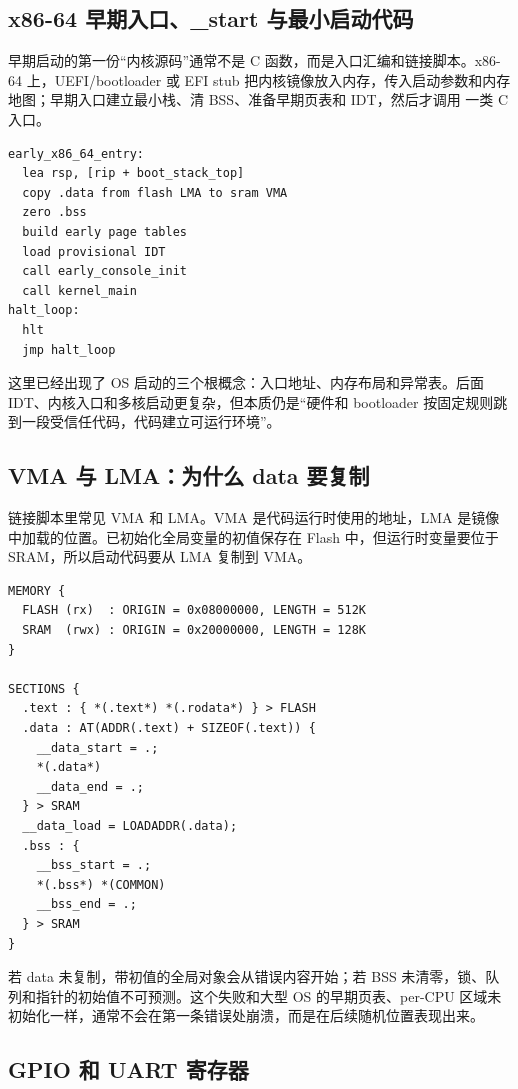 \subsection{x86-64 早期入口、\_start 与最小启动代码}

早期启动的第一份“内核源码”通常不是 C 函数，而是入口汇编和链接脚本。x86-64 上，UEFI/bootloader 或 EFI stub 把内核镜像放入内存，传入启动参数和内存地图；早期入口建立最小栈、清 BSS、准备早期页表和 IDT，然后才调用  一类 C 入口。

\begin{lstlisting}
early_x86_64_entry:
  lea rsp, [rip + boot_stack_top]
  copy .data from flash LMA to sram VMA
  zero .bss
  build early page tables
  load provisional IDT
  call early_console_init
  call kernel_main
halt_loop:
  hlt
  jmp halt_loop
\end{lstlisting}

这里已经出现了 OS 启动的三个根概念：入口地址、内存布局和异常表。后面 IDT、内核入口和多核启动更复杂，但本质仍是“硬件和 bootloader 按固定规则跳到一段受信任代码，代码建立可运行环境”。

\subsection{VMA 与 LMA：为什么 data 要复制}

链接脚本里常见 VMA 和 LMA。VMA 是代码运行时使用的地址，LMA 是镜像中加载的位置。已初始化全局变量的初值保存在 Flash 中，但运行时变量要位于 SRAM，所以启动代码要从 LMA 复制到 VMA。

\begin{lstlisting}
MEMORY {
  FLASH (rx)  : ORIGIN = 0x08000000, LENGTH = 512K
  SRAM  (rwx) : ORIGIN = 0x20000000, LENGTH = 128K
}

SECTIONS {
  .text : { *(.text*) *(.rodata*) } > FLASH
  .data : AT(ADDR(.text) + SIZEOF(.text)) {
    __data_start = .;
    *(.data*)
    __data_end = .;
  } > SRAM
  __data_load = LOADADDR(.data);
  .bss : {
    __bss_start = .;
    *(.bss*) *(COMMON)
    __bss_end = .;
  } > SRAM
}
\end{lstlisting}

若 data 未复制，带初值的全局对象会从错误内容开始；若 BSS 未清零，锁、队列和指针的初始值不可预测。这个失败和大型 OS 的早期页表、per-CPU 区域未初始化一样，通常不会在第一条错误处崩溃，而是在后续随机位置表现出来。

\subsection{GPIO 和 UART 寄存器}

